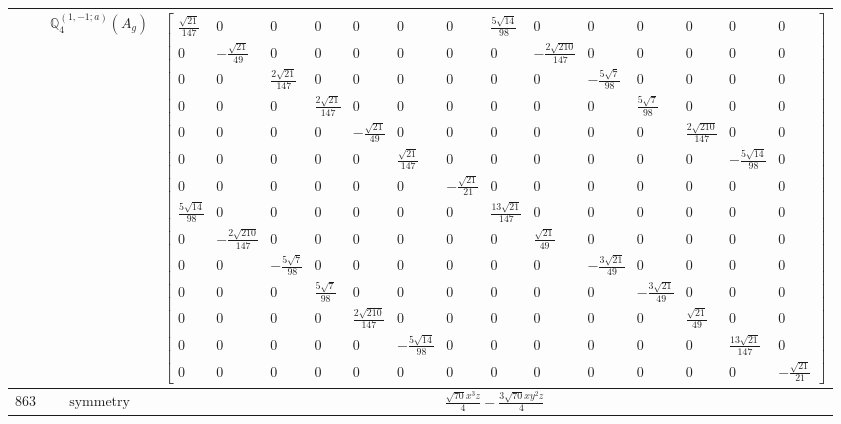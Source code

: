 \documentclass[fleqn,8pt,landscape]{jsarticle}
\begin{document}
\begin{longtable}{ccc}
$  $ & $ \mathbb{Q}_{4}^{(1,-1;a)}(A_{g}) $ & $ \begin{bmatrix} \frac{\sqrt{21}}{147} & 0 & 0 & 0 & 0 & 0 & 0 & \frac{5 \sqrt{14}}{98} & 0 & 0 & 0 & 0 & 0 & 0 \\ 0 & - \frac{\sqrt{21}}{49} & 0 & 0 & 0 & 0 & 0 & 0 & - \frac{2 \sqrt{210}}{147} & 0 & 0 & 0 & 0 & 0 \\ 0 & 0 & \frac{2 \sqrt{21}}{147} & 0 & 0 & 0 & 0 & 0 & 0 & - \frac{5 \sqrt{7}}{98} & 0 & 0 & 0 & 0 \\ 0 & 0 & 0 & \frac{2 \sqrt{21}}{147} & 0 & 0 & 0 & 0 & 0 & 0 & \frac{5 \sqrt{7}}{98} & 0 & 0 & 0 \\ 0 & 0 & 0 & 0 & - \frac{\sqrt{21}}{49} & 0 & 0 & 0 & 0 & 0 & 0 & \frac{2 \sqrt{210}}{147} & 0 & 0 \\ 0 & 0 & 0 & 0 & 0 & \frac{\sqrt{21}}{147} & 0 & 0 & 0 & 0 & 0 & 0 & - \frac{5 \sqrt{14}}{98} & 0 \\ 0 & 0 & 0 & 0 & 0 & 0 & - \frac{\sqrt{21}}{21} & 0 & 0 & 0 & 0 & 0 & 0 & 0 \\ \frac{5 \sqrt{14}}{98} & 0 & 0 & 0 & 0 & 0 & 0 & \frac{13 \sqrt{21}}{147} & 0 & 0 & 0 & 0 & 0 & 0 \\ 0 & - \frac{2 \sqrt{210}}{147} & 0 & 0 & 0 & 0 & 0 & 0 & \frac{\sqrt{21}}{49} & 0 & 0 & 0 & 0 & 0 \\ 0 & 0 & - \frac{5 \sqrt{7}}{98} & 0 & 0 & 0 & 0 & 0 & 0 & - \frac{3 \sqrt{21}}{49} & 0 & 0 & 0 & 0 \\ 0 & 0 & 0 & \frac{5 \sqrt{7}}{98} & 0 & 0 & 0 & 0 & 0 & 0 & - \frac{3 \sqrt{21}}{49} & 0 & 0 & 0 \\ 0 & 0 & 0 & 0 & \frac{2 \sqrt{210}}{147} & 0 & 0 & 0 & 0 & 0 & 0 & \frac{\sqrt{21}}{49} & 0 & 0 \\ 0 & 0 & 0 & 0 & 0 & - \frac{5 \sqrt{14}}{98} & 0 & 0 & 0 & 0 & 0 & 0 & \frac{13 \sqrt{21}}{147} & 0 \\ 0 & 0 & 0 & 0 & 0 & 0 & 0 & 0 & 0 & 0 & 0 & 0 & 0 & - \frac{\sqrt{21}}{21} \end{bmatrix} $ \\ \hline
$ 863 $ & $ \text{symmetry} $ & $ \frac{\sqrt{70} x^{3} z}{4} - \frac{3 \sqrt{70} x y^{2} z}{4} $ \\

\end{longtable}
\end{document}
